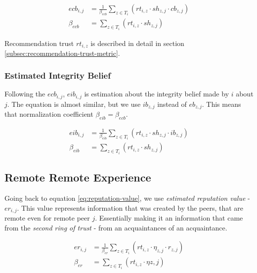\begin{equation}
\label{eq:estimated-competence-belief}
\begin{split}
    ecb_{i,j} &= \frac{1}{\beta_{ecb}} \sum_{z \in T_{i}} \left(rt_{i, z} \cdot sh_{z, j} \cdot cb_{z, j}\right) \\
    \beta_{ecb} &= \sum_{z \in T_{i}} \left(rt_{i, z} \cdot sh_{z, j}\right)
\end{split}
\end{equation}

\noindent
Recommendation trust $rt_{i, z}$ is described in detail in section \ref{subsec:recommendation-trust-metric}.

\subsubsection{Estimated Integrity Belief}
Following the $ecb_{i,j}$, $eib_{i,j}$ is estimation about the integrity belief made by $i$ about $j$.
The equation is almost similar, but we use $ib_{z,j}$ instead of $eb_{z,j}$.
This means that normalization coefficient $\beta_{eib} = \beta_{ecb}$.

\begin{equation}
\label{eq:estimated-integrity-belief}
\begin{split}
    eib_{i,j} &= \frac{1}{\beta_{eib}} \sum_{z \in T_{i}} \left(rt_{i, z} \cdot sh_{z, j} \cdot ib_{z, j}\right) \\
    \beta_{eib} &= \sum_{z \in T_{i}} \left(rt_{i, z} \cdot sh_{z, j}\right)
\end{split}
\end{equation}

\subsection{Remote Remote Experience}
Going back to equation \ref{eq:reputation-value}, we use \textit{estimated reputation value} - $er_{i,j}$.
This value represents information that was created by the peers, that are remote even for remote peer $j$. 
Essentially making it an information that came from the \textit{second ring of trust} - from an acquaintances of an acquaintance.

\begin{equation}
\label{eq:estimated-reputation}
\begin{split}
    er_{i,j} &= \frac{1}{\beta_{er}} \sum_{z \in T_{i}} \left(rt_{i, z} \cdot \eta_{z, j} \cdot r_{z, j}\right) \\
    \beta_{er} &= \sum_{z \in T_{i}} \left(rt_{i, z} \cdot \eta{z, j}\right)
\end{split}
\end{equation}

